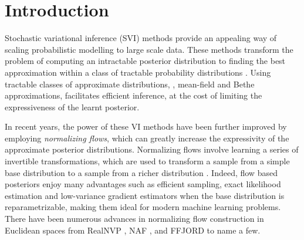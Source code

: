 \section{Introduction}
Stochastic variational inference (SVI) methods provide an appealing way of scaling probabilistic modelling to large scale data.
These methods transform the problem of computing an intractable posterior distribution to finding the best approximation within a class of tractable probability distributions \cite{hoffman2013stochastic}.
Using tractable classes of approximate distributions, \eg, mean-field and Bethe approximations, facilitates efficient inference, at the cost of limiting the expressiveness of the learnt posterior. 

In recent years, the power of these VI methods have been further improved by employing {\em normalizing flows}, which can greatly increase the expressivity of the approximate posterior distributions. 
Normalizing flows involve learning a series of invertible transformations, which are used to transform a sample from a simple base distribution to a sample from a richer distribution \cite{rezende2015variational}. 
Indeed, flow based posteriors enjoy many advantages such as efficient sampling, exact likelihood estimation and low-variance gradient estimators when the base distribution is reparametrizable, making them ideal for modern machine learning problems.
There have been numerous advances in normalizing flow construction in Euclidean spaces from RealNVP \cite{dinh2016density}, NAF \cite{huang2018neural}, and FFJORD \cite{grathwohl2018ffjord} to name a few.

